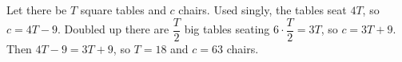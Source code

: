 Let there be $T$ square tables and $c$ chairs. Used singly, the tables seat $4T$, so $c=4T-9$. Doubled up there are $\dfrac {T}{2}$ big tables seating $6\cdot\dfrac {T}{2}=3T$, so $c=3T+9$. Then $4T-9=3T+9$, so $T=18$ and $c=\boxed{63}$ chairs.
